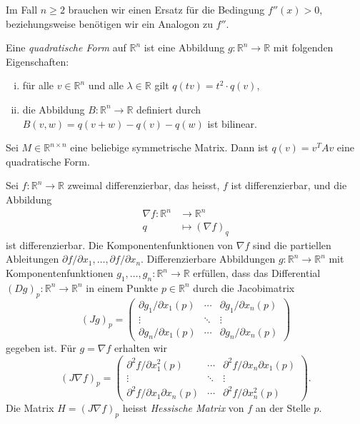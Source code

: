 \documentclass[../main.tex]{subfiles}
\begin{document}
Im Fall $n \geq 2$ brauchen wir einen
Ersatz für die Bedingung $f''(x) > 0$, beziehungsweise
benötigen wir ein Analogon zu $f''$.

\begin{definition}
  Eine \emph{quadratische Form} auf $\mathbb{R}^n$ 
  ist eine Abbildung $g \colon \mathbb{R}^n \to \mathbb{R}$ 
  mit folgenden Eigenschaften:
  \begin{enumerate}[(i)]
    \item für alle $v \in \mathbb{R}^n$ 
      und alle $\lambda \in \mathbb{R}$ gilt $q(tv) = t^2 \cdot q(v)$,
    \item die Abbildung 
      $B \colon \mathbb{R}^n \to \mathbb{R}$ 
      definiert durch $B(v, w) = q(v + w) - q(v) - q(w)$ 
      ist bilinear.
  \end{enumerate}
\end{definition}

\begin{example}
  Sei $M \in \mathbb{R}^{n \times n}$ eine beliebige 
  symmetrische Matrix.
  Dann ist $q(v) = v^T A v$ eine quadratische Form.
\end{example}

Sei $f \colon \mathbb{R}^n \to \mathbb{R}$ zweimal differenzierbar, das heisst,
$f$ ist differenzierbar, und die Abbildung
\begin{align*}
  \nabla f \colon \mathbb{R}^n & \to \mathbb{R}^n \\
  q & \mapsto {(\nabla f)}_q
\end{align*}
ist differenzierbar.
Die Komponentenfunktionen von $\nabla f$ sind die
partiellen Ableitungen $\partial f / \partial x_1, \dots,
\partial f / \partial x_n$.
Differenzierbare Abbildungen
$g \colon \mathbb{R}^n \to \mathbb{R}^n$ mit
Komponentenfunktionen $g_1, \dots, g_n \colon \mathbb{R}^n \to \mathbb{R}$ 
erfüllen, dass das Differential ${(Dg)}_p \colon \mathbb{R}^n \to \mathbb{R}^n$ 
in einem Punkte $p \in \mathbb{R}^n$ durch die
Jacobimatrix 
\[
{(Jg)}_p =
\begin{pmatrix}
  \partial g_1 / \partial x_1 (p) & \cdots & \partial g_1/\partial x_n (p) \\
  \vdots & \ddots & \vdots \\
  \partial g_n / \partial x_1 (p) & \cdots & \partial g_n / \partial x_n (p)
\end{pmatrix}
\]
gegeben ist.
Für $g = \nabla f$ erhalten wir
\[
  {(J \nabla f )}_p =
  \begin{pmatrix}
    \partial^2 f / \partial x_1^2 (p) 
    & \cdots 
    & \partial^2 f / \partial x_n \partial x_1 (p) \\
    \vdots & \ddots & \vdots \\
    \partial^2 f / \partial x_1 \partial x_n (p)
    & \cdots
    & \partial^2 f / \partial x_n^2 (p)
  \end{pmatrix}.
\]
Die Matrix $H = {(J \nabla f)}_p$ heisst \emph{Hessische Matrix}
von $f$ an der Stelle $p$.
\end{document}
